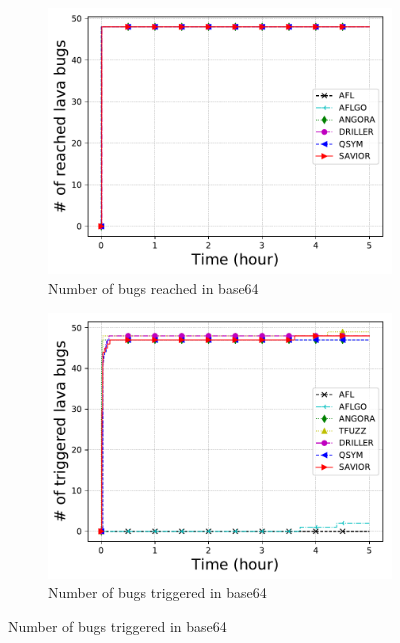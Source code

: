\begin{figure}[htb]
    \centering   
    \begin{subfigure}[b]{0.24\textwidth}
        \centering
        \includegraphics[width=1\textwidth]{savior/figures/lava_base64_bugcov.pdf}
        \caption{\scriptsize{Number of bugs reached in base64}}
        \label{fig:eval:lava:uniq}
    \end{subfigure}
        \begin{subfigure}[b]{0.24\textwidth}
        \centering
        \includegraphics[width=1\textwidth]{savior/figures/lava_base64.pdf}
        \caption{\scriptsize{Number of bugs triggered in base64}}
        \label{fig:eval:lava:base64}

\end{subfigure}
\end{figure}
